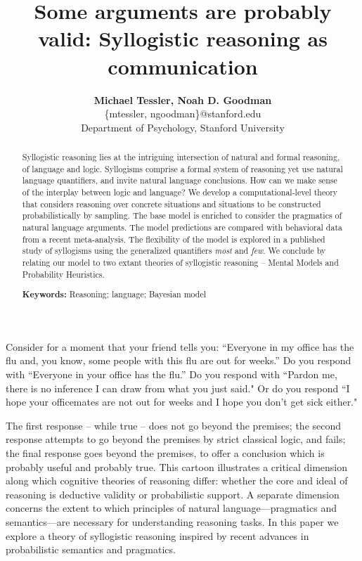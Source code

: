 \documentclass[10pt,letterpaper]{article}
\begin{document}
\title{Some arguments are probably valid: Syllogistic reasoning as communication}
 
\author{{\large \bf Michael Tessler, Noah D. Goodman } \\
	\{mtessler, ngoodman\}@stanford.edu \\
  Department of Psychology, Stanford University}

\maketitle


\begin{abstract}
Syllogistic reasoning lies at the intriguing intersection of natural and formal reasoning, of language and logic. Syllogisms comprise a formal system of reasoning yet use natural language quantifiers, and invite natural language conclusions. How can we make sense of the interplay between logic and language? We develop a computational-level theory that considers reasoning over concrete situations and situations to be constructed probabilistically by sampling. The base model is enriched to consider the pragmatics of natural language arguments. The model predictions are compared with behavioral data from a recent meta-analysis. The flexibility of the model is explored in a published study of syllogisms using the generalized quantifiers \emph{most} and \emph{few}. We conclude by relating our model to two extant theories of syllogistic reasoning -- Mental Models and Probability Heuristics.

\textbf{Keywords:} 
Reasoning; language; Bayesian model
\end{abstract}


Consider for a moment that your friend tells you:
``Everyone in my office has the flu and, you know, some people with this flu are out for weeks.''
Do you respond with
``Everyone in your office has the flu.''
Do you respond with
``Pardon me, there is no inference I can draw from what you just said."
Or do you respond
 ``I hope your officemates are not out for weeks and I hope you don't get sick either."
 
 
 The first response -- while true -- does not go beyond the premises; the second response attempts to go beyond the premises by strict classical logic, and fails; the final response goes beyond the premises, to offer a conclusion which is probably useful and probably true.
% 
This cartoon illustrates a critical dimension along which cognitive theories of reasoning differ: whether the core and ideal of reasoning is deductive validity or probabilistic support. A separate dimension concerns the extent to which principles of natural language---pragmatics and semantics---are necessary for understanding reasoning tasks. In this paper we explore a theory of syllogistic reasoning inspired by recent advances in probabilistic semantics and pragmatics.
\end{document}
